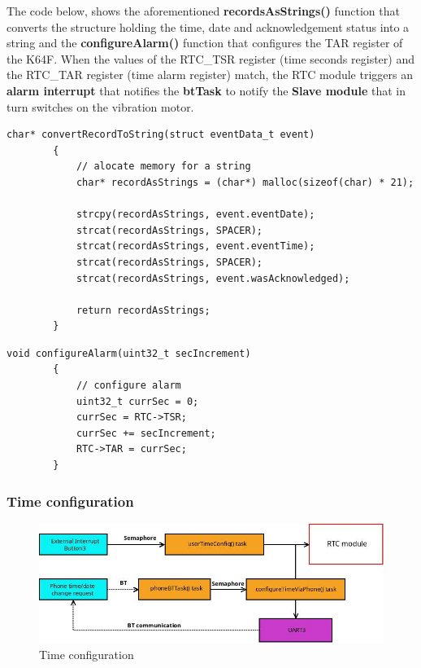 \documentclass[12pt,a4paper]{article}
\begin{document}
        The code below, shows the aforementioned {\bfseries recordsAsStrings()} function that converts the structure holding the time, date and acknowledgement status into a string and the {\bfseries configureAlarm()} function that configures the TAR register of the K64F. When the values of the RTC\_TSR register (time seconds register) and the RTC\_TAR register (time alarm register) match, the RTC module triggers an {\bfseries alarm interrupt} that notifies the {\bfseries btTask} to notify the {\bfseries Slave module} that in turn switches on the vibration motor.
        \begin{lstlisting}[label={lst:crtString}, caption=convertRecordToString()]
        char* convertRecordToString(struct eventData_t event)
        {
            // alocate memory for a string
            char* recordAsStrings = (char*) malloc(sizeof(char) * 21);

            strcpy(recordAsStrings, event.eventDate);
            strcat(recordAsStrings, SPACER);
            strcat(recordAsStrings, event.eventTime);
            strcat(recordAsStrings, SPACER);
            strcat(recordAsStrings, event.wasAcknowledged);

            return recordAsStrings;
        }
        \end{lstlisting}
        
        \begin{lstlisting}[label={lst:confAlarm}, caption=configureAlarm()]
        void configureAlarm(uint32_t secIncrement)
        {
            // configure alarm
            uint32_t currSec = 0;
            currSec = RTC->TSR;
            currSec += secIncrement;
            RTC->TAR = currSec;
        }
        \end{lstlisting}
        
        \subsubsection*{Time configuration}
        \begin{figure}
         \centering
         \includegraphics[width=\textwidth]{extInt_and_phone.jpg}
         \caption{Time configuration}
        \end{figure}
\end{document}
